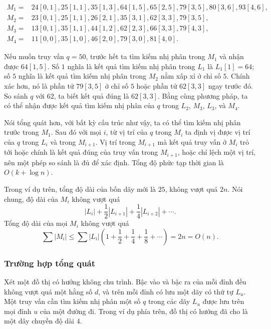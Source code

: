 \documentclass[11pt]{article}
\begin{document}
\begin{small}
\[
\begin{aligned}
M_1={}&24[0,1],25[1,1],35[1,3],64[1,5],65[2,5],79[3,5],80[3,6],93[4,6],\\
M_2={}&23[0,1],25[1,1],26[2,1],35[3,1],62[3,3],79[3,5],\\
M_3={}&13[0,1],35[1,1],44[1,2],62[2,3],66[3,3],79[4,3],\\
M_4={}&11[0,0],35[1,0],46[2,0],79[3,0],81[4,0].
\end{aligned}
\]
\end{small}

Nếu muốn truy vấn $q=50$, trước hết ta tìm kiếm nhị phân trong $M_1$ và nhận
được $64[1,5]$. Số $1$ nghĩa là kết quả tìm kiếm nhị phân trong $L_1$ là
$L_1[1]=64$; số $5$ nghĩa là kết quả tìm kiếm nhị phân trong $M_2$ nằm xấp xỉ ở
chỉ số $5$. Chính xác hơn, nó là phần tử $79[3,5]$ ở chỉ số $5$ hoặc phần tử
$62[3,3]$ ngay trước đó. So sánh $q$ với $62$, ta biết kết quả đúng là
$62[3,3]$. Bằng cùng phương pháp, ta có thể nhận được kết quả tìm kiếm nhị phân
của $q$ trong $L_2$, $M_3$, $L_3$, và $M_4$.

Nói tổng quát hơn, với bất kỳ cấu trúc như vậy, ta có thể tìm kiếm nhị phân
trước trong $M_1$. Sau đó với mọi $i$, từ vị trí của $q$ trong $M_i$ ta định vị
được vị trí của $q$ trong $L_i$ và trong $M_{i+1}$. Vị trí trong $M_{i+1}$ mà
kết quả truy vấn ở $M_i$ trỏ tới hoặc chính là kết quả đúng của truy vấn trong
$M_{i+1}$, hoặc chỉ lệch một vị trí, nên một phép so sánh là đủ để xác định.
Tổng độ phức tạp thời gian là $O(k+\log n)$.

Trong ví dụ trên, tổng độ dài của bốn dãy mới là $25$, không vượt quá $2n$.
Nói chung, độ dài của $M_i$ không vượt quá
\[
|L_i|+\frac12|L_{i+1}|+\frac14|L_{i+2}|+\cdots.
\]
Tổng độ dài của mọi $M_i$ không vượt quá
\[
\sum |M_i| \le \sum |L_i|\left(1+\frac12+\frac14+\frac18+\cdots\right)=2n=O(n).
\]

\subsubsection{Trường hợp tổng quát}

Xét một đồ thị có hướng không chu trình. Bậc vào và bậc ra của mỗi đỉnh đều
không vượt quá một hằng số $d$, và trên mỗi đỉnh có lưu một dãy có thứ tự
$L_u$. Một truy vấn cần tìm kiếm nhị phân một số $q$ trong các dãy $L_u$ được
lưu trên mọi đỉnh $u$ của một đường đi. Trong ví dụ phía trên, đồ thị có hướng
đã cho là một dây chuyền độ dài $4$.
\end{document}
